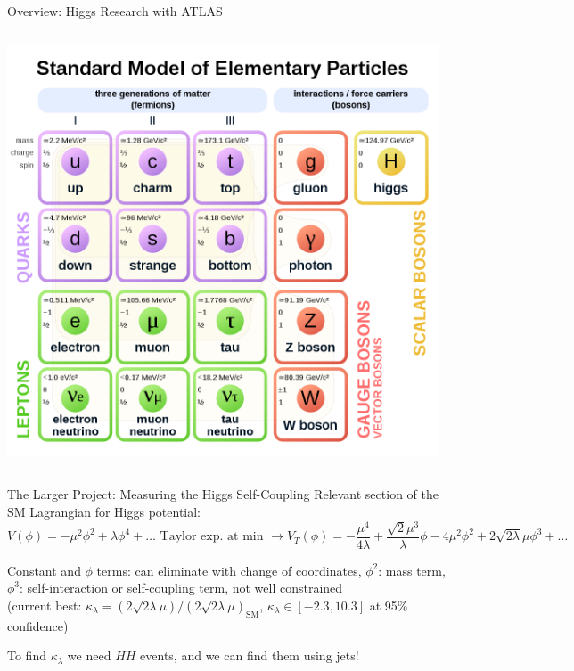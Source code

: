 \documentclass[10pt, aspectratio=169]{beamer}
\begin{document}
{\begin{frame}{Overview: Higgs Research with ATLAS}
\begin{columns}[onlytextwidth]
    \begin{column}{0.6\textwidth}
      \includegraphics[width=0.9\linewidth]{images/Standard_Model_of_Elementary_Particles.png}
    \end{column}
​  \end{columns}
\end{frame}
}


\begin{frame}{The Larger Project: Measuring the Higgs Self-Coupling}
  Relevant section of the SM Lagrangian for Higgs potential:\\
  
  $$V(\phi) = -\mu^2 \phi^2 + \lambda \phi^4 + \ldots \text{ Taylor exp. at min } \to V_T(\phi) = -\frac{\mu^4}{4\lambda} + \frac{\sqrt{2}\mu^3}{\lambda} \phi - 4 \mu^2\phi^2 + 2\sqrt{2\lambda}\mu\phi^3 + \ldots$$
  
  Constant and $\phi$ terms: can eliminate with change of coordinates, $\phi^2$: mass term,\\
  $\phi^3$: self-interaction or \alert{self-coupling} term, not well constrained\\ (current best: $\kappa_\lambda = (2\sqrt{2\lambda}\mu)/(2\sqrt{2\lambda}\mu)_{\text{SM}}$, $\kappa_\lambda \in [-2.3, 10.3]$ at 95\% confidence)

  
  To find $\kappa_\lambda$ we need $HH$ events, and we can find them using jets!
\end{frame}
\end{document}
